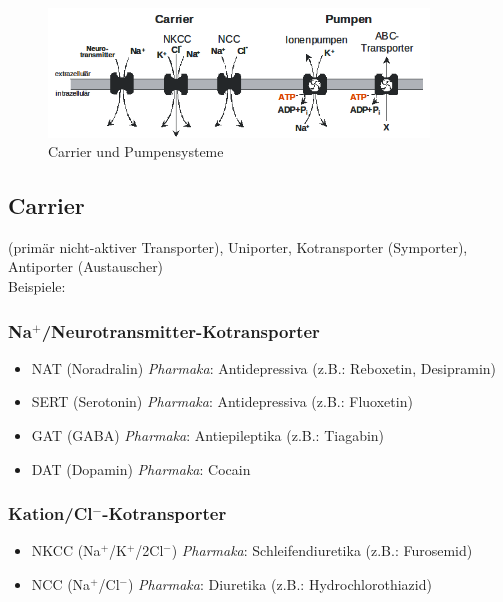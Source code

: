 \documentclass[10pt,a4paper]{report}
\begin{document}
\begin{figure}[tb]
	\centering
	\includegraphics[width=0.9\textwidth]{Bilder/carrierpumpen.png}
	\caption{Carrier und Pumpensysteme}
	\label{fig:carrierpumpen}
\end{figure}

\subsection{Carrier}
(primär nicht-aktiver Transporter), Uniporter, Kotransporter (Symporter), Antiporter (Austauscher)\\Beispiele:

\subsubsection{Na$^+$/Neurotransmitter-Kotransporter}

\begin{itemize}
	\item NAT (Noradralin)	\textit{Pharmaka}: Antidepressiva (z.B.: Reboxetin, Desipramin)
	\item SERT (Serotonin)	\textit{Pharmaka}: Antidepressiva (z.B.: Fluoxetin) 
	\item GAT (GABA)	\textit{Pharmaka}: Antiepileptika (z.B.: Tiagabin)
	\item DAT (Dopamin)	\textit{Pharmaka}: Cocain
\end{itemize} 

\subsubsection{Kation/Cl$^-$-Kotransporter}

\begin{itemize}
	\item NKCC (Na$^+$/K$^+$/2Cl$^-$)	\textit{Pharmaka}: Schleifendiuretika (z.B.: Furosemid)
	\item NCC (Na$^+$/Cl$^-$)		\textit{Pharmaka}: Diuretika (z.B.: Hydrochlorothiazid)
\end{itemize} 
\end{document}
